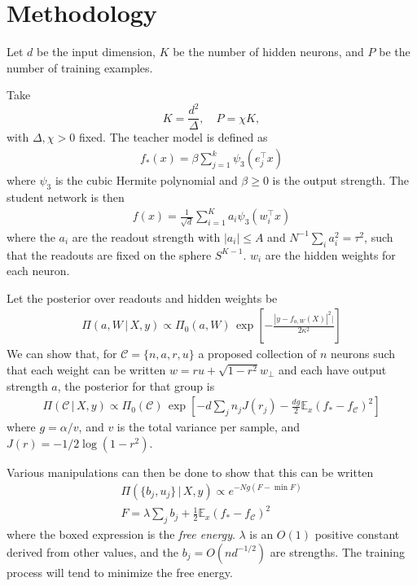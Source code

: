 \documentclass[midterm]{sparreport}
\theoremstyle{definition}
\newcommand{\E}{\mathbb{E}}
\newcommand{\comm}{\mathcal{C}}
\begin{document}
\section{Methodology}

Let $d$ be the input dimension, $K$ be the number of hidden neurons, and $P$ be the number of training examples.

Take
\begin{equation}
    K = \frac{d^2}{\Delta},\quad P = \chi K,
\end{equation}
with $\Delta, \chi > 0$ fixed.
The teacher model is defined as
\begin{align*}
    f_*(x) = \beta \sum_{j=1}^k \psi_3(e_j^\top x)
\end{align*}
where $\psi_3$ is the cubic Hermite polynomial and $\beta \geq 0$ is the output strength.
The student network is then
\begin{align*}
    f(x) = \frac{1}{\sqrt{d}} \sum_{i=1}^{K} a_i \psi_3(w_i^\top x)
\end{align*}
where the $a_i$ are the readout strength with $|a_i| \leq A$ and $N^{-1} \sum_i a_i^2 = \tau^2$, such that the readouts are fixed on the sphere $S^{K-1}$.
$w_i$ are the hidden weights for each neuron.

Let the posterior over readouts and hidden weights be
\begin{align*}
    \Pi(a, W \,|\, X, y)
    \propto \Pi_0(a, W) \,\exp\left[ - \frac{|y - f_{a, W}(X)|^2|}{2\kappa^2} \right]
\end{align*}
We can show that, for $\comm = \{n, a, r, u\}$ a proposed collection of $n$ neurons such that each weight can be written $w = ru + \sqrt{1-r^2}w_\perp$ and each have output strength $a$, the posterior for that group is
\begin{align*}
    \Pi(\comm \,|\, X, y)
    \propto \Pi_0(\comm) \, \exp\left[ -d \sum_j n_j J(r_j) -\frac{dg}{2} \E_x (f_* - f_\comm)^2 \right]
\end{align*}
where $g = \alpha/v$, and $v$ is the total variance per sample, and $J(r) = -1/2 \log(1-r^2)$.

Various manipulations can then be done to show that this can be written
\begin{align*}
    \Pi(\{b_j, u_j\} \,|\, X, y)
    \propto e^{-Ng(F - \min F)} \\
    \boxed{F = \lambda \sum_j b_j + \frac{1}{2} \E_x (f_* - f_\comm)^2}
\end{align*}
where the boxed expression is the \emph{free energy}.
$\lambda$ is an $O(1)$ positive constant derived from other values, and the $b_j = O(n d^{-1/2})$ are strengths.
The training process will tend to minimize the free energy.
\end{document}
